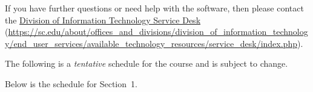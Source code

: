 \documentclass[11pt,letterpaper]{article}
\begin{document}
If you have further questions or need help with the software, then please contact the \href{https://sc.edu/about/offices\_and\_divisions/division\_of\_information\_technology/end\_user\_services/available\_technology\_resources/service\_desk/index.php}{Division of Information Technology Service Desk} (\url{https://sc.edu/about/offices\_and\_divisions/division\_of\_information\_technology/end\_user\_services/available\_technology\_resources/service\_desk/index.php}). \sectionbreak






The following is a \emph{tentative} schedule for the course and is subject to change. \par\vspace{0.3cm}

Below is the schedule for Section~1.
\end{document}
